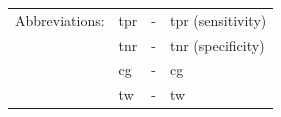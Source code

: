 \documentclass{article}
\begin{document}
\begin{table}[ht]
{        \vspace{2pt}
        \setlength{\tabcolsep}{4pt}
            \begin{tabular}{llll}
                \hspace{-6pt} Abbreviations: & \acs{tpr} & - & \acl{tpr} (sensitivity) \\
                & \acs{tnr} & - & \acl{tnr} (specificity) \\
                & \acs{cg}  & - & \acl{cg}                \\
                & \acs{tw}  & - & \acl{tw}                \\
            \end{tabular}
        }
        \label{tab:results_first_application_set}
    \end{table}
\end{document}
